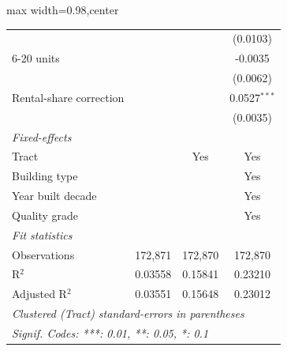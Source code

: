 \begin{table}[htbp]
\begin{adjustbox}{max width=0.98\textwidth,center}
\begin{tabular}{lccc}
                                                 &                 &                 & (0.0103)\\   
         6-20 units                              &                 &                 & -0.0035\\   
                                                 &                 &                 & (0.0062)\\   
         Rental-share correction                 &                 &                 & 0.0527$^{***}$\\   
                                                 &                 &                 & (0.0035)\\   
         \midrule
         \emph{Fixed-effects}\\
         Tract                                   &                 & Yes             & Yes\\  
         Building type                           &                 &                 & Yes\\  
         Year built decade                       &                 &                 & Yes\\  
         Quality grade                           &                 &                 & Yes\\  
         \midrule
         \emph{Fit statistics}\\
         Observations                            & 172,871         & 172,870         & 172,870\\  
         R$^2$                                   & 0.03558         & 0.15841         & 0.23210\\  
         Adjusted R$^2$                          & 0.03551         & 0.15648         & 0.23012\\  
         \midrule \midrule
         \multicolumn{4}{l}{\emph{Clustered (Tract) standard-errors in parentheses}}\\
         \multicolumn{4}{l}{\emph{Signif. Codes: ***: 0.01, **: 0.05, *: 0.1}}\\
      \end{tabular}
   \end{adjustbox}
\end{table}


